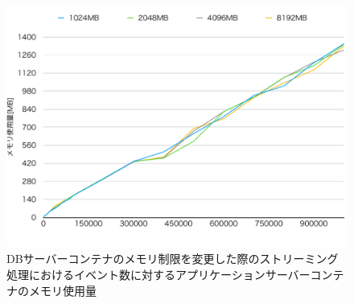 \documentclass[../../../../../main]{subfiles}
\begin{document}
    \begin{figure}[H]
        \centering
        \includegraphics[width=12cm]{graph}
        \caption{DBサーバーコンテナのメモリ制限を変更した際のストリーミング処理におけるイベント数に対するアプリケーションサーバーコンテナのメモリ使用量}
        \label{fig:stream-change-db-memory-limit-app-memory-app_4_8192-db_400}
    \end{figure}
\end{document}
